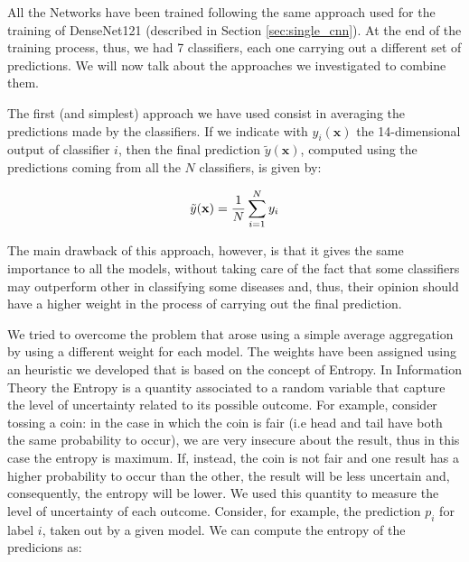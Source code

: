 All the Networks have been trained following the same approach used for the training of DenseNet121 (described in Section \ref{sec:single_cnn}). At the end of the training process, thus, we had 7 classifiers, each one carrying out a different set of predictions. We will now talk about the approaches we investigated to combine them.

\vspace{5mm}

\noindent{}

\vspace{2mm}

\noindent The first (and simplest) approach we have used consist in averaging the predictions made by the classifiers. If we indicate with $y_{i}(\mathbf{x})$ the 14-dimensional output of classifier $i$, then the final prediction $\tilde{y}(\mathbf{x})$, computed using the predictions coming from all the $N$ classifiers, is given by:  

\begin{equation}
    \centering
    \tilde{y}(\mathbf{x}) = \frac{1}{N}\sum_{i=1}^{N} y_{i}
    \label{eq:eq_4.5}
\end{equation}

\vspace{3mm}

\noindent The main drawback of this approach, however, is that it gives the same importance to all the models, without taking care of the fact that some classifiers may outperform other in classifying some diseases and, thus, their opinion should have a higher weight in the process of carrying out the final prediction.

\vspace{7mm}

\noindent{}

\vspace{2mm}

\noindent We tried to overcome the problem that arose using a simple average aggregation by using a different weight for each model. The weights have been assigned using an heuristic we developed that is based on the concept of Entropy. In Information Theory the Entropy is a quantity associated to a random variable that capture the level of uncertainty related to its possible outcome. For example, consider tossing a coin: in the case in which the coin is fair (i.e head and tail have both the same probability to occur), we are very insecure about the result, thus in this case the entropy is maximum. If, instead, the coin is not fair and one result has a higher probability to occur than the other, the result will be less uncertain and, consequently, the entropy will be lower.
We used this quantity to measure the level of uncertainty of each outcome. Consider, for example, the prediction $p_{i}$ for label $i$, taken out by a given model. We can compute the entropy of the predicions as: 

